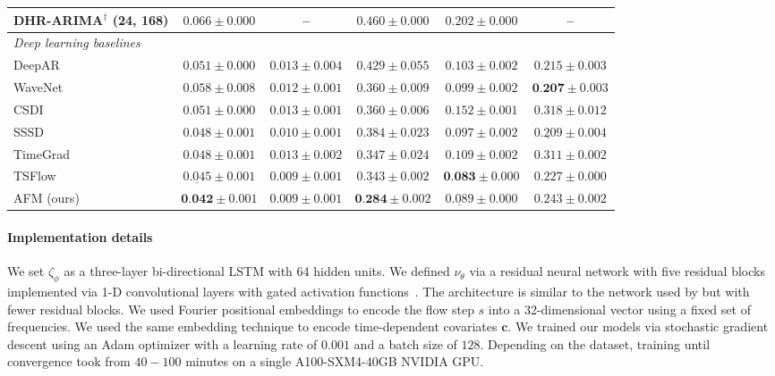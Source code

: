 \documentclass[preprint,12pt,authoryear]{elsarticle}
\newcommand{\oldrev}[1]{#1}
\newcommand{\rev}[1]{#1}
\newcommand{\rev}[1]{\textcolor{blue}{#1}}
\begin{document}
\begin{table}[!tbp]
\begin{adjustbox}{max width=\textwidth}
\begin{small}
\begin{tabular}{lccccc}
    \rev{DHR-ARIMA$^\dagger$ (24, 168)}   & \rev{$0.066 \pm 0.000$} & -- & \rev{$0.460 \pm 0.000$} & \rev{$0.202 \pm 0.000$} & -- \\
    \midrule
    \multicolumn{6}{l}{\textit{Deep learning baselines}} \\
    DeepAR           & $0.051 \pm 0.000$ & $0.013 \pm 0.004$ & $0.429 \pm \rev{0.055}$ & $0.103 \pm \rev{0.002}$ & $0.215 \pm 0.003$ \\
    WaveNet          & $0.058 \pm 0.008$ & $0.012 \pm 0.001$ & $0.360 \pm \rev{0.009}$ & $0.099 \pm \rev{0.002}$ & $\textbf{0.207} \pm \rev{0.003}$ \\
    CSDI             & $0.051 \pm 0.000$ & $0.013 \pm \rev{0.001}$ & $0.360 \pm \rev{0.006}$ & $0.152 \pm \rev{0.001}$ & $0.318 \pm 0.012$ \\
    SSSD             & $0.048 \pm \rev{0.001}$ & \rev{$0.010 \pm 0.001$} & \rev{$0.384 \pm 0.023$} & \rev{$0.097 \pm 0.002$} & $\underline{0.209} \pm \rev{0.004}$ \\
    TimeGrad         & $0.048 \pm 0.001$ & $0.013 \pm 0.002$ & $0.347 \pm 0.024$ & $0.109 \pm 0.002$ & $0.311 \pm 0.002$ \\
    TSFlow           & $\underline{0.045} \pm 0.001$ & \rev{$0.009 \pm 0.001$} & $\underline{0.343} \pm 0.002$ & $\textbf{0.083} \pm 0.000$ & $0.227 \pm 0.000$ \\
    \midrule
    AFM \oldrev{(ours)}       & $\textbf{0.042} \pm 0.001$ & \rev{$0.009 \pm 0.001$} & $\textbf{0.284} \pm 0.002$ & $\underline{0.089} \pm 0.000$ & $0.243 \pm 0.002$ \\
    \bottomrule
  \end{tabular}
\end{small}
\end{adjustbox}
\end{table}

\paragraph{Implementation details} We set $\zeta_\phi$ as a three-layer bi-directional LSTM with 64 hidden units. We defined $\nu_\theta$ via a residual neural network with five residual blocks implemented via 1-D convolutional layers with gated activation functions~\citep{van2016wavenet, kong2020diffwave}. The architecture is similar to the network used by \citet{rasul2021autoregressive} but with fewer residual blocks. We used Fourier positional embeddings to encode the flow step $s$ into a 32-dimensional vector using a fixed set of frequencies. We used the same embedding technique to encode time-dependent covariates $\mathbf{c}$. We trained our models via stochastic gradient descent using an Adam optimizer with a learning rate of $0.001$ and a batch size of $128$. Depending on the dataset, training until convergence took from $40-100$ minutes on a single A100-SXM4-40GB NVIDIA GPU. 
\end{document}
